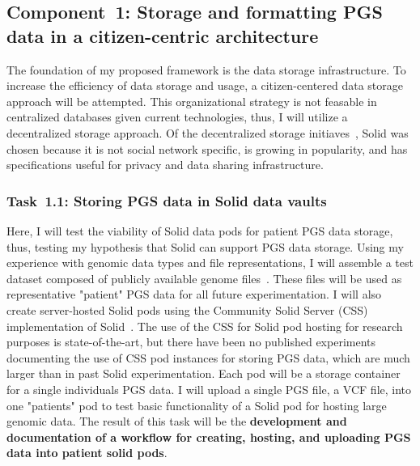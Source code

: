 \documentclass[a4paper,11pt]{article}
\begin{document}
\begin{refsection}
\newcommand\WPa{Storage and formatting PGS data in a citizen-centric architecture}
\subsection{Component~1: \WPa}

The foundation of my proposed framework is the data storage infrastructure.
To increase the efficiency of data storage and usage, a citizen-centered data storage approach will be attempted.
This organizational strategy is not feasable in centralized databases given current technologies, thus, I will utilize a decentralized storage approach.
Of the decentralized storage initiaves~\cite{solid, mastodon, decentralizednanopubs}, Solid was chosen because it is not social network specific, is growing in popularity, and has specifications useful for privacy and data sharing infrastructure.


\newcommand\WPaa{Storing PGS data in Solid data vaults}
\subsubsection{Task~1.1: \WPaa}


Here, I will test the viability of Solid data pods for patient PGS data storage, thus, testing my hypothesis that Solid can support PGS data storage. 
Using my experience with genomic data types and file representations, I will assemble a test dataset composed of publicly available genome files~\cite{platinum_genomes, 1000_genomes}. 
These files will be used as representative "patient" PGS data for all future experimentation. 
I will also create server-hosted Solid pods using the Community Solid Server (CSS) implementation of Solid~\cite{css}. 
The use of the CSS for Solid pod hosting for research purposes is state-of-the-art, but there have been no published experiments documenting the use of CSS pod instances for storing PGS data, which are much larger than in past Solid experimentation.
Each pod will be a storage container for a single individual\textquotesingle s PGS data. 
I will upload a single PGS file, a VCF file, into one "patient\textquotesingle s" pod to test basic functionality of a Solid pod for hosting large genomic data. 
The result of this task will be the \textbf{development and documentation of a workflow for creating, hosting, and uploading PGS data into patient solid pods}.



\end{refsection}
\end{document}
